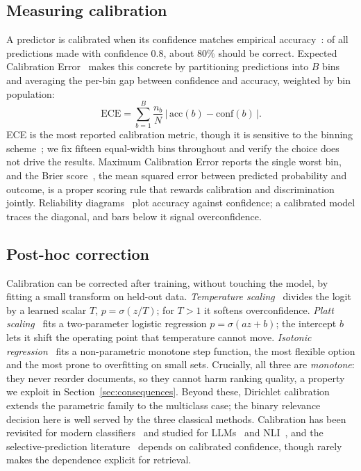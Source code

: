 \documentclass[sigconf,nonacm]{acmart}
\newcommand{\ece}{\mathrm{ECE}}
\newcommand{\sig}{\sigma}
\begin{document}
\subsection{Measuring calibration}
A predictor is calibrated when its confidence matches empirical
accuracy~\cite{degroot1983}: of all predictions made with confidence $0.8$, about
$80\%$ should be correct. Expected Calibration Error~\cite{naeini2015} makes this
concrete by partitioning predictions into $B$ bins and averaging the per-bin gap
between confidence and accuracy, weighted by bin population:
\begin{equation}
\ece = \sum_{b=1}^{B} \frac{n_b}{N}\,\bigl|\,\mathrm{acc}(b) - \mathrm{conf}(b)\,\bigr|.
\end{equation}
ECE is the most reported calibration metric, though it is sensitive to the binning
scheme~\cite{nixon2019,roelofs2022}; we fix fifteen equal-width bins throughout and
verify the choice does not drive the results. Maximum Calibration Error reports the
single worst bin, and the Brier score~\cite{brier1950}, the mean squared error between
predicted probability and outcome, is a proper scoring rule that rewards calibration
and discrimination jointly. Reliability diagrams~\cite{niculescu2005} plot accuracy
against confidence; a calibrated model traces the diagonal, and bars below it signal
overconfidence.

\subsection{Post-hoc correction}
Calibration can be corrected after training, without touching the model, by fitting a
small transform on held-out data. \emph{Temperature scaling}~\cite{guo2017} divides
the logit by a learned scalar $T$, $p = \sig(z/T)$; for $T>1$ it softens
overconfidence. \emph{Platt scaling}~\cite{platt1999} fits a two-parameter logistic
regression $p = \sig(az+b)$; the intercept $b$ lets it shift the operating point that
temperature cannot move. \emph{Isotonic regression}~\cite{zadrozny2002} fits a
non-parametric monotone step function, the most flexible option and the most prone to
overfitting on small sets. Crucially, all three are \emph{monotone}: they never
reorder documents, so they cannot harm ranking quality, a property we exploit in
Section~\ref{sec:consequences}. Beyond these, Dirichlet
calibration~\cite{kull2019} extends the parametric family to the multiclass case; the
binary relevance decision here is well served by the three classical methods.
Calibration has been revisited for modern classifiers~\cite{minderer2021} and studied
for LLMs~\cite{kadavath2022,tian2023,geng2024survey} and NLI~\cite{desai2020}, and the
selective-prediction literature~\cite{geifman2017,el2010} depends on calibrated
confidence, though rarely makes the dependence explicit for retrieval.
\end{document}
